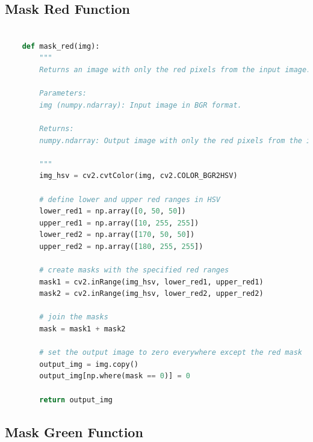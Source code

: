 \subsection{Mask Red Function}
\begin{lstlisting}[language=Python, caption=Mask Red Function]

    def mask_red(img):
        """
        Returns an image with only the red pixels from the input image.

        Parameters:
        img (numpy.ndarray): Input image in BGR format.

        Returns:
        numpy.ndarray: Output image with only the red pixels from the input image.

        """
        img_hsv = cv2.cvtColor(img, cv2.COLOR_BGR2HSV)

        # define lower and upper red ranges in HSV
        lower_red1 = np.array([0, 50, 50])
        upper_red1 = np.array([10, 255, 255])
        lower_red2 = np.array([170, 50, 50])
        upper_red2 = np.array([180, 255, 255])

        # create masks with the specified red ranges
        mask1 = cv2.inRange(img_hsv, lower_red1, upper_red1)
        mask2 = cv2.inRange(img_hsv, lower_red2, upper_red2)

        # join the masks
        mask = mask1 + mask2

        # set the output image to zero everywhere except the red mask
        output_img = img.copy()
        output_img[np.where(mask == 0)] = 0

        return output_img


\end{lstlisting}



\newpage

\subsection{Mask Green Function}


